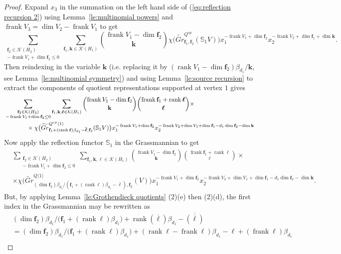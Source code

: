 \documentclass{amsart}
\numberwithin{equation}{section}
\theoremstyle{definition}
\def\SS{\mathbb{S}}
\def\bff{\mathbf{f}}
\def\bfk{\mathbf{k}}
\def\bfl{{\ensuremath{\boldsymbol\ell}}}
\def\cK{\mathcal{K}}
\def\dim{\operatorname{dim}}
\def\frank{\operatorname{frank}}
\def\rank{\operatorname{rank}}
\newcommand{\rev}[1]{\overline{#1}}%
\renewcommand{\eqref}[1]{{\rm (\ref{#1})}}
\begin{document}
\begin{proof}
  Expand $x_3$ in the summation on the left hand side of \eqref{eq:reflection recursion 2} using Lemma~\ref{le:multinomial powers} and $\frank V_3=\dim V_2-\frank V_1$ to get
  \[\sum\limits_{\substack{\bff_2\in\cK(H_2)\\-\frank V_1+\dim\bff_2\le0}}\sum\limits_{\bff_1,\bfk\in\cK(H_1)}{\frank V_1-\dim\bff_2\choose\bfk}\chi\big(\widetilde{Gr}^{Q^{op}}_{\bff_1,\bff_2}(\SS_1 V)\big)x_1^{-\frank V_1+\dim\bff_2}x_2^{-\frank V_2+\dim\bff_1+\dim\bfk}.\]
  Then reindexing in the variable $\bfk$ (i.e. replacing it by $(\rank V_1-\dim\bff_2)\beta_{d_1}/\bfk$, see Lemma~\ref{le:multinomial symmetry}) and using Lemma~\ref{le:source recursion} to extract the components of quotient representations supported at vertex $1$ gives
  \begin{align*}
    &\sum\limits_{\substack{\bff_2\in\cK(H_2)\\-\frank V_1+\dim\bff_2\le0}}\sum\limits_{\bff_1,\bfk,\bfl\in\cK(H_1)}{\frank V_1-\dim\bff_2\choose\bfk}{\frank\bff_1+\rank\bfl\choose\bfl}\times\\
    &\hspace{0.5in}\times\chi\big(\widetilde{Gr}^{Q^{op}\langle 1\rangle}_{\bff_1+(\rank\bfl)\beta_{d_1}-\rev{\bfl},\bff_2}(\SS_1 V)\big) x_1^{-\frank V_1+\dim\bff_2}x_2^{-\frank V_2+\dim V_1+\dim\bff_1-d_1\dim\bff_2-\dim\bfk}
  \end{align*}
  Now apply the reflection functor $\SS_1$ in the Grassmannian to get
  \begin{align*}
    &\sum\limits_{\substack{\bff_2\in\cK(H_2)\\-\frank V_1+\dim\bff_2\le0}}\sum\limits_{\bff_1,\bfk,\bfl\in\cK(H_1)}{\frank V_1-\dim\bff_2\choose\bfk}{\frank\bff_1+\rank\bfl\choose\bfl}\times\\
    &\times\chi\big(\widetilde{Gr}^{Q\langle 1\rangle}_{(\dim\bff_2)\beta_{d_1}/(\bff_1+(\rank\bfl)\beta_{d_1}-\rev{\bfl}),\bff_2}(V)\big) x_1^{-\frank V_1+\dim\bff_2}x_2^{-\frank V_2+\dim V_1+\dim\bff_1-d_1\dim\bff_2-\dim\bfk}.
  \end{align*}
  But, by applying Lemma~\ref{le:Grothendieck quotients} (2)(e) then (2)(d), the first index in the Grassmannian may be rewritten as
  \begin{align*}
    &(\dim\bff_2)\beta_{d_1}/\big(\bff_1+(\rank\bfl)\beta_{d_1}\big)+\rank(\rev{\bfl})\beta_{d_1}-\rev{(\rev{\bfl})}\\
    &=(\dim\bff_2)\beta_{d_1}/\big(\bff_1+(\rank\bfl)\beta_{d_1}\big)+(\rank\bfl-\frank\bfl)\beta_{d_1}-\bfl+(\frank\bfl)\beta_{d_1}\\

\end{align*}
\end{proof}
\end{document}
